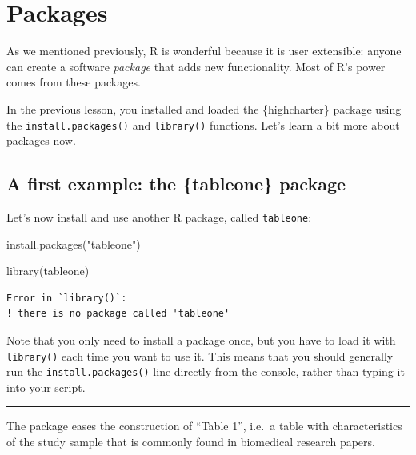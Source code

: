 \documentclass[
  letterpaper,
  DIV=11,
  numbers=noendperiod]{scrreprt}
\newenvironment{Shaded}{\begin{snugshade}}{\end{snugshade}}
\newcommand{\FunctionTok}[1]{\textcolor[rgb]{0.28,0.35,0.67}{#1}}
\newcommand{\NormalTok}[1]{\textcolor[rgb]{0.00,0.23,0.31}{#1}}
\newcommand{\StringTok}[1]{\textcolor[rgb]{0.13,0.47,0.30}{#1}}
\begin{document}
\section{Packages}\label{packages-1}

As we mentioned previously, R is wonderful because it is user
extensible: anyone can create a software \emph{package} that adds new
functionality. Most of R's power comes from these packages.

In the previous lesson, you installed and loaded the \{highcharter\}
package using the \texttt{install.packages()} and \texttt{library()}
functions. Let's learn a bit more about packages now.

\subsection{A first example: the \{tableone\}
package}\label{a-first-example-the-tableone-package}

Let's now install and use another R package, called \texttt{tableone}:

\begin{Shaded}
\begin{Highlighting}[]
\FunctionTok{install.packages}\NormalTok{(}\StringTok{"tableone"}\NormalTok{)}
\end{Highlighting}
\end{Shaded}

\begin{Shaded}
\begin{Highlighting}[]
\FunctionTok{library}\NormalTok{(tableone)}
\end{Highlighting}
\end{Shaded}

\begin{verbatim}
Error in `library()`:
! there is no package called 'tableone'
\end{verbatim}

Note that you only need to install a package once, but you have to load
it with \texttt{library()} each time you want to use it. This means that
you should generally run the \texttt{install.packages()} line directly
from the console, rather than typing it into your script.

\begin{center}\rule{0.5\linewidth}{0.5pt}\end{center}

The package eases the construction of ``Table 1'', i.e.~a table with
characteristics of the study sample that is commonly found in biomedical
research papers.
\end{document}
